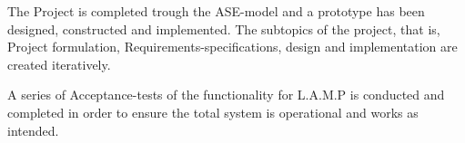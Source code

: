 The Project is completed trough the ASE-model and a prototype has been designed, constructed and implemented. The subtopics of the project, that is, Project formulation, Requirements-specifications, design and implementation are created iteratively.

A series of Acceptance-tests of the functionality for L.A.M.P is conducted and completed in order to ensure the total system is operational and works as intended.
